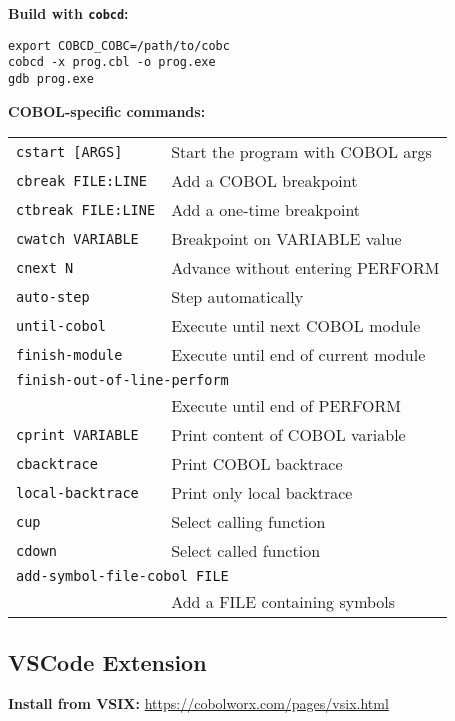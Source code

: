 \documentclass[10pt,landscape]{article}
\begin{document}
\begin{multicols}{3}
{\bf Build with \verb+cobcd+:}\vspace{-3mm}
\begin{verbatim}
export COBCD_COBC=/path/to/cobc
cobcd -x prog.cbl -o prog.exe
gdb prog.exe
\end{verbatim}\vspace{-2mm}
{\bf COBOL-specific commands:}
\begin{tabular}{ll}
\verb+cstart [ARGS]+ & Start the program with COBOL args \\
\verb+cbreak FILE:LINE+ & Add a COBOL breakpoint \\
\verb+ctbreak FILE:LINE+ & Add a one-time breakpoint \\
\verb+cwatch VARIABLE+ & Breakpoint on VARIABLE value \\
\verb+cnext N+ & Advance without entering PERFORM \\
\verb+auto-step+ & Step automatically \\
\verb+until-cobol+ & Execute until next COBOL module\\
\verb+finish-module+ & Execute until end of current module\\
\multicolumn{2}{l}{\tt finish-out-of-line-perform} \\
   & Execute until end of PERFORM \\
\verb+cprint VARIABLE+ & Print content of COBOL variable \\
\verb+cbacktrace+ & Print COBOL backtrace \\
\verb+local-backtrace+ & Print only local backtrace \\
\verb+cup+ & Select calling function\\
\verb+cdown+ & Select called function \\
\multicolumn{2}{l}{\tt add-symbol-file-cobol FILE} \\
  & Add a FILE containing symbols \\
\end{tabular}

  \subsection{VSCode Extension}

{\bf Install from VSIX:}
\url{https://cobolworx.com/pages/vsix.html}


\end{multicols}
\end{document}
